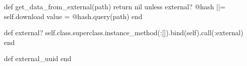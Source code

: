 \begin{frame}[fragile, t]
\begin{onlyenv}
\begin{tcblisting}
  def get_data_from_external(path)
    return nil unless external?
    @hash ||= self.download
    value = @hash.query(path)
  end

  def external?
    self.class.superclass.instance_method(:[]).bind(self).call(:external)
  end

  def external_uuid
  end
  \end{tcblisting}

  \end{onlyenv}
\end{frame}